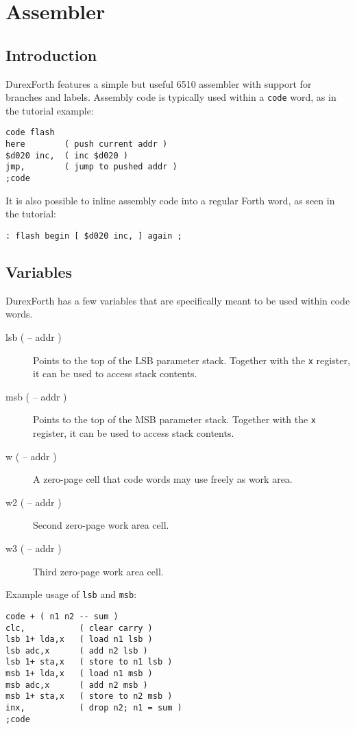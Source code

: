 \chapter{Assembler}

\section{Introduction}

DurexForth features a simple but useful 6510 assembler with support for branches and labels. Assembly code is typically used within a \texttt{code} word, as in the tutorial example:

\begin{verbatim}
code flash
here        ( push current addr )
$d020 inc,  ( inc $d020 )
jmp,        ( jump to pushed addr )
;code
\end{verbatim}

It is also possible to inline assembly code into a regular Forth word, as seen in the tutorial:

\begin{verbatim}
: flash begin [ $d020 inc, ] again ;
\end{verbatim}

\section{Variables}

DurexForth has a few variables that are specifically meant to be used within code words.

\begin{description}
    \item[lsb ( -- addr )] Points to the top of the LSB parameter stack. Together with the \texttt{x} register, it can be used to access stack contents.
    \item[msb ( -- addr )] Points to the top of the MSB parameter stack. Together with the \texttt{x} register, it can be used to access stack contents.
    \item[w ( -- addr )] A zero-page cell that code words may use freely as work area.
    \item[w2 ( -- addr )] Second zero-page work area cell.
    \item[w3 ( -- addr )] Third zero-page work area cell.
\end{description}

Example usage of \texttt{lsb} and \texttt{msb}:

\begin{verbatim}
code + ( n1 n2 -- sum )
clc,           ( clear carry )
lsb 1+ lda,x   ( load n1 lsb )
lsb adc,x      ( add n2 lsb )
lsb 1+ sta,x   ( store to n1 lsb )
msb 1+ lda,x   ( load n1 msb )
msb adc,x      ( add n2 msb )
msb 1+ sta,x   ( store to n2 msb )
inx,           ( drop n2; n1 = sum )
;code
\end{verbatim}


